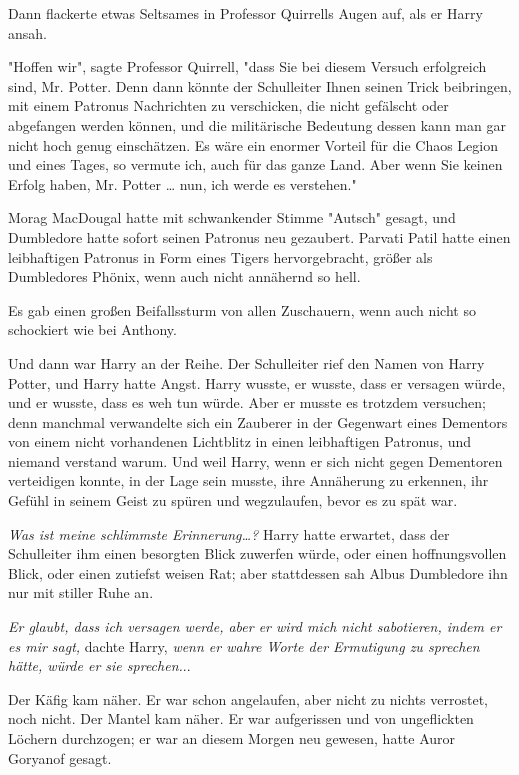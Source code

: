 {Dann flackerte etwas Seltsames in Professor Quirrells Augen auf, als er Harry ansah.

"Hoffen wir", sagte Professor Quirrell, "dass Sie bei diesem Versuch erfolgreich sind, Mr. Potter. Denn dann könnte der Schulleiter Ihnen seinen Trick beibringen, mit einem Patronus Nachrichten zu verschicken, die nicht gefälscht oder abgefangen werden können, und die militärische Bedeutung dessen kann man gar nicht hoch genug einschätzen. Es wäre ein enormer Vorteil für die Chaos Legion und eines Tages, so vermute ich, auch für das ganze Land. Aber wenn Sie keinen Erfolg haben, Mr. Potter … nun, ich werde es verstehen."

Morag MacDougal hatte mit schwankender Stimme "Autsch" gesagt, und Dumbledore hatte sofort seinen Patronus neu gezaubert. Parvati Patil hatte einen leibhaftigen Patronus in Form eines Tigers hervorgebracht, größer als Dumbledores Phönix, wenn auch nicht annähernd so hell.

Es gab einen großen Beifallssturm von allen Zuschauern, wenn auch nicht so schockiert wie bei Anthony.

Und dann war Harry an der Reihe. Der Schulleiter rief den Namen von Harry Potter, und Harry hatte Angst. Harry wusste, er wusste, dass er versagen würde, und er wusste, dass es weh tun würde. Aber er musste es trotzdem versuchen; denn manchmal verwandelte sich ein Zauberer in der Gegenwart eines Dementors von einem nicht vorhandenen Lichtblitz in einen leibhaftigen Patronus, und niemand verstand warum. Und weil Harry, wenn er sich nicht gegen Dementoren verteidigen konnte, in der Lage sein musste, ihre Annäherung zu erkennen, ihr Gefühl in seinem Geist zu spüren und wegzulaufen, bevor es zu spät war.

\emph{\hfill\break Was ist meine schlimmste Erinnerung…?} Harry hatte erwartet, dass der Schulleiter ihm einen besorgten Blick zuwerfen würde, oder einen hoffnungsvollen Blick, oder einen zutiefst weisen Rat; aber stattdessen sah Albus Dumbledore ihn nur mit stiller Ruhe an.

\emph{Er glaubt, dass ich versagen werde, aber er wird mich nicht sabotieren, indem er es mir sagt,} dachte Harry, \emph{wenn er wahre Worte der Ermutigung zu sprechen hätte, würde er sie sprechen.}..

Der Käfig kam näher. Er war schon angelaufen, aber nicht zu nichts verrostet, noch nicht. Der Mantel kam näher. Er war aufgerissen und von ungeflickten Löchern durchzogen; er war an diesem Morgen neu gewesen, hatte Auror Goryanof gesagt.

}
